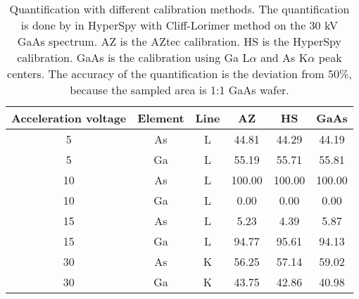 
\begin{table}[ht]
    \centering
    \caption{
        Quantification with different calibration methods.
        The quantification is done by in HyperSpy with Cliff-Lorimer method on the 30 kV GaAs spectrum.
        AZ is the AZtec calibration.
        HS is the HyperSpy calibration.
        GaAs is the calibration using Ga L$\alpha$ and As K$\alpha$ peak centers.
        The accuracy of the quantification is the deviation from 50\%, because the sampled area is 1:1 GaAs wafer.
    }
    \label{tab:results:calibration-quantification}
    \begin{tabular}{cccccc}
        Acceleration voltage & Element & Line & AZ     & HS     & GaAs   \\
        \hline
        5                    & As      & L    & 44.81  & 44.29  & 44.19  \\
        5                    & Ga      & L    & 55.19  & 55.71  & 55.81  \\
        10                   & As      & L    & 100.00 & 100.00 & 100.00 \\
        10                   & Ga      & L    & 0.00   & 0.00   & 0.00   \\
        15                   & As      & L    & 5.23   & 4.39   & 5.87   \\
        15                   & Ga      & L    & 94.77  & 95.61  & 94.13  \\
        30                   & As      & K    & 56.25  & 57.14  & 59.02  \\
        30                   & Ga      & K    & 43.75  & 42.86  & 40.98
    \end{tabular}
\end{table}